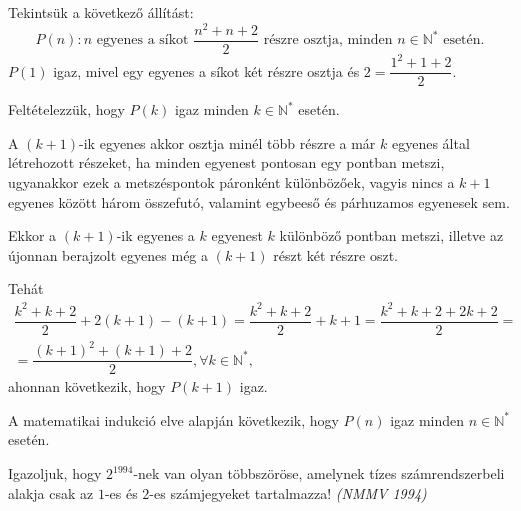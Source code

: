 \begin{solution}
Tekintsük a következő állítást: 
\[
P(n):n\text{ egyenes a síkot }\dfrac{n^{2}+n+2}{2}\text{ részre osztja, minden }n\in\mathbb{N}^{*}\text{ esetén.}
\]
$P(1)$ igaz, mivel egy egyenes a síkot két részre osztja és $2=\dfrac{1^{2}+1+2}{2}$.

Feltételezzük, hogy $P(k)$ igaz minden $k\in\mathbb{N}^{*}$ esetén.

A $(k+1)$-ik egyenes akkor osztja minél több részre a már $k$ egyenes
által létrehozott részeket, ha minden egyenest pontosan egy pontban
metszi, ugyanakkor ezek a metszéspontok páronként különbözőek, vagyis
nincs a $k+1$ egyenes között három összefutó, valamint egybeeső és
párhuzamos egyenesek sem.

Ekkor a $(k+1)$-ik egyenes a $k$ egyenest $k$ különböző pontban
metszi, illetve az újonnan berajzolt egyenes még a $(k+1)$ részt
két részre oszt.

Tehát 
\[
\begin{array}{l}
\dfrac{k^{2}+k+2}{2}+2(k+1)-(k+1)=\dfrac{k^{2}+k+2}{2}+k+1=\dfrac{k^{2}+k+2+2k+2}{2}=\\
=\dfrac{(k+1)^{2}+(k+1)+2}{2},\forall k\in\mathbb{N}^{*},
\end{array}
\]
ahonnan következik, hogy $P(k+1)$ igaz.

A matematikai indukció elve alapján következik, hogy $P(n)$ igaz
minden $n\in\mathbb{N}^{*}$ esetén. 
\end{solution}
\begin{extraproblem}
Igazoljuk, hogy $2^{1994}$-nek van olyan többszöröse, amelynek tízes
számrendszerbeli alakja csak az $1$-es és $2$-es számjegyeket tartalmazza!
\emph{(NMMV 1994) }
\end{extraproblem}

